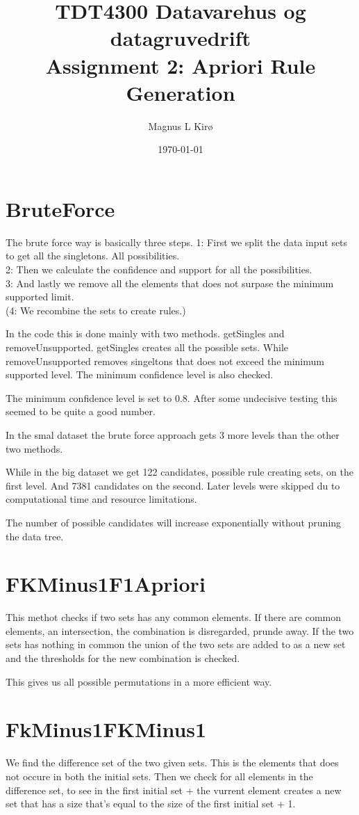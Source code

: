 \documentclass[12pt, a4paper]{article}
\title{TDT4300 Datavarehus og datagruvedrift \\ Assignment 2: Apriori Rule Generation}
\author{
        Magnus L Kirø \\
}
\date{\today}
\begin{document}
\maketitle
{}

\section{BruteForce}
The brute force way is basically three steps. 
1: First we split the data input sets to get all the singletons. All possibilities. \\
2: Then we calculate the confidence and support for all the possibilities.\\
3: And lastly we remove all the elements that does not surpase the minimum supported limit. \\
(4: We recombine the sets to create rules.)

In the code this is done mainly with two methods. getSingles and removeUnsupported. getSingles creates all the possible sets. 
While removeUnsupported removes singeltons that does not exceed the minimum supported level. The minimum confidence level is also checked.

The minimum confidence level is set to 0.8. After some undecisive testing this seemed to be quite a good number.   

In the smal dataset the brute force approach gets 3 more levels than the other two methods.

While in the big dataset we get 122 candidates, possible rule creating sets, on the first level. 
And 7381 candidates on the second. Later levels were skipped du to computational time and resource limitations. 

The number of possible candidates will increase exponentially without  pruning the data tree.


\section{FKMinus1F1Apriori}
This methot checks if two sets has any common elements. If there are common elements, an intersection, the combination is disregarded, prunde away. 
If the two sets has nothing in common the union of the two sets are added to as a new set and the thresholds for the new combination is checked. 

This gives us all possible permutations in a more efficient way. 


\section{FkMinus1FKMinus1}
We find the difference set of the two given sets. This is the elements that does not occure in both the initial sets. 
Then we check for all elements in the difference set, to see in the first initial set + the vurrent element creates a new set that has a size that's equal to the size of the first initial set + 1. 
\end{document}
